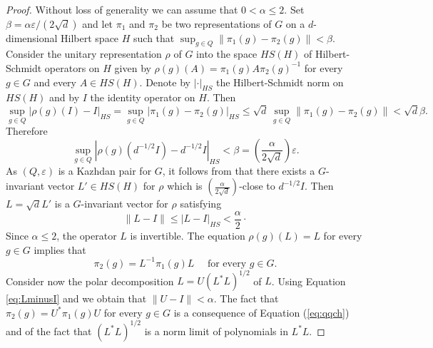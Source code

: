 \documentclass[11pt,english,a4paper]{smfart}
\numberwithin{equation}{section}
\theoremstyle{definition}
\begin{document}
\begin{proof}
Without loss of generality we can assume that $0<\alpha \le 2$. 
Set $\beta = \alpha \varepsilon/(2\sqrt{d})$ and let $\pi_1$ and $\pi_2$ be two representations of $G$ on a $d$-dimensional Hilbert space $H$ such 
that $\sup_{g\in Q}  \|\pi_1(g) - \pi_2(g)\| < \beta$. Consider 
the unitary representation $\rho$ of $G$ into the space $HS(H)$ of Hilbert-Schmidt operators on $H$ given by
$ \rho(g)(A) = \pi_1(g)A\pi_2(g)^{-1}$ for every $g\in G$ and every $ A \in HS(H)$.
Denote by $|\cdot|_{HS}$ the Hilbert-Schmidt norm on $HS(H)$
and by $I$ the identity operator on $H$.
Then
\[
\sup_{g\in Q}\left|\rho(g)(I)-I\right|_{HS} = \sup_{g\in Q}\left|\pi_1(g)-\pi_2(g)\right|_{HS} \le  \sqrt{d}\,\sup_{g\in Q}\|\pi_1(g)-\pi_2(g)\| < \sqrt{d}\beta .
\]
Therefore
$$ \sup_{g\in Q} |\rho(g)(d^{-1/2}I) - d^{-1/2}I|_{HS} < \beta 
= \left(\frac{\alpha}{2\sqrt{d}}\right)\varepsilon .$$
As $({Q},\varepsilon)$ is a Kazhdan pair for $G$, it follows 
from \cite[Prop.~1.1.9]{BdHV} that there exists 
 a $G$-invariant vector $L' \in HS(H)$ for $\rho$ which 
is $\left(\frac{\alpha}{2\sqrt{d}}\right)$-close to $d^{-1/2}I$. 
Then $L = \sqrt{d}L'$ is a $G$-invariant vector for $\rho$ satisfying
\begin{equation}\label{eq:LminusI}
\|L-I\| \le \left|L-I\right|_{HS} < \frac{\alpha}{2}\cdot
\end{equation}
Since $\alpha \le 2$, the operator $L$ is invertible. The equation $\rho(g)(L) = L$ for every $g\in G$ implies that
\begin{equation}\label{eq:qqch}
 \pi_2(g) = L^{-1}\pi_1(g)L\quad  \textrm{ for every } g\in G .
\end{equation}
Consider now  the polar decomposition $L = U(L^*L)^{1/2}$ of $L$. 
Using Equation \eqref{eq:LminusI} and \cite[Lem.~4.5]{BOTulam} we obtain that
$\|U-I\| < \alpha$.
The fact that $\pi_2(g) = U^{*}\pi_1(g)U$ for every $g\in G$ is a consequence of Equation (\ref{eq:qqch}) and of the fact that $(L^*L)^{1/2}$ is a norm limit of polynomials in $L^*L$.
\end{proof} 
\end{document}
